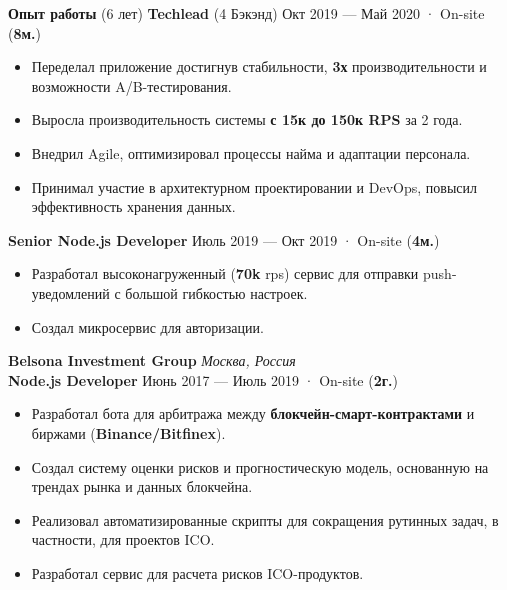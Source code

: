 \documentclass{resume}
\begin{document}
\begin{rSection}{\textbf{Опыт работы} (6 лет) }
    \textbf{Techlead} (4 Бэкэнд) \hfill Окт 2019 --- Май 2020 · On-site ({\textbf{8м.}})
    \begin{itemize}
        \item Переделал приложение достигнув стабильности, \textbf{3х} производительности и возможности A/B-тестирования\@.
        \item Выросла производительность системы \textbf{с 15к до 150к RPS} за 2 года\@.
        \item Внедрил Agile, оптимизировал процессы найма и адаптации персонала\@.
        \item Принимал участие в архитектурном проектировании и DevOps, повысил эффективность хранения данных\@.
    \end{itemize}

    \textbf{Senior Node.js Developer} \hfill Июль 2019 --- Окт 2019 · On-site ({\textbf{4м.}})
    \begin{itemize}
        \item Разработал высоконагруженный (\textbf{70k} rps) сервис для отправки push-уведомлений с большой гибкостью настроек\@.
        \item Создал микросервис для авторизации\@.
    \end{itemize}

    \textbf{Belsona Investment Group} \hfill \textit{Москва, Россия} \\
    \textbf{Node.js Developer}  \hfill Июнь 2017 --- Июль 2019 · On-site ({\textbf{2г.}})
    \begin{itemize}
        \item Разработал бота для арбитража между \textbf{блокчейн-смарт-контрактами} и биржами (\textbf{Binance/Bitfinex})\@.
        \item Создал систему оценки рисков и прогностическую модель, основанную на трендах рынка и данных блокчейна\@.
        \item Реализовал автоматизированные скрипты для сокращения рутинных задач, в частности, для проектов ICO\@.
        \item Разработал сервис для расчета рисков ICO-продуктов\@.
    \end{itemize}

\end{rSection}
\end{document}
